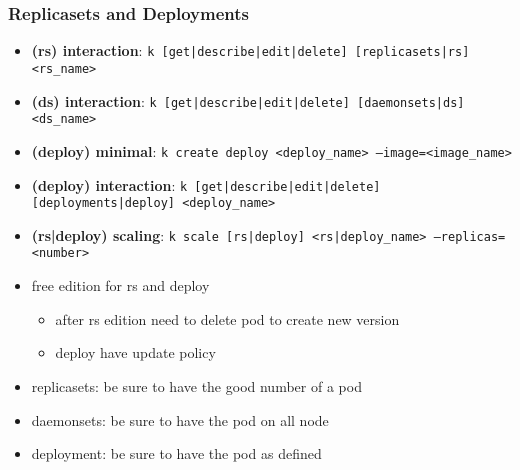 \subsubsection{Replicasets and Deployments}
\begin{frame}[fragile]{\subsubsecname}

  \begin{itemize}
    \item \textbf{(rs) interaction}: \texttt{k [get|describe|edit|delete] [replicasets|rs] <rs\_name>}
    \item \textbf{(ds) interaction}: \texttt{k [get|describe|edit|delete] [daemonsets|ds] <ds\_name>}
    \item \textbf{(deploy) minimal}: \texttt{k create deploy <deploy\_name> --image=<image\_name>}
    \item \textbf{(deploy) interaction}: \texttt{k [get|describe|edit|delete] [deployments|deploy] <deploy\_name>}
    \item \textbf{(rs|deploy) scaling}: \texttt{k scale [rs|deploy] <rs|deploy\_name> --replicas=<number>}
    \item free edition for rs and deploy
    \begin{itemize}
      \item after rs edition need to delete pod to create new version
      \item deploy have update policy
    \end{itemize}
    \item replicasets: be sure to have the good number of a pod
    \item daemonsets: be sure to have the pod on all node
    \item deployment: be sure to have the pod as defined
  \end{itemize}

\end{frame}
